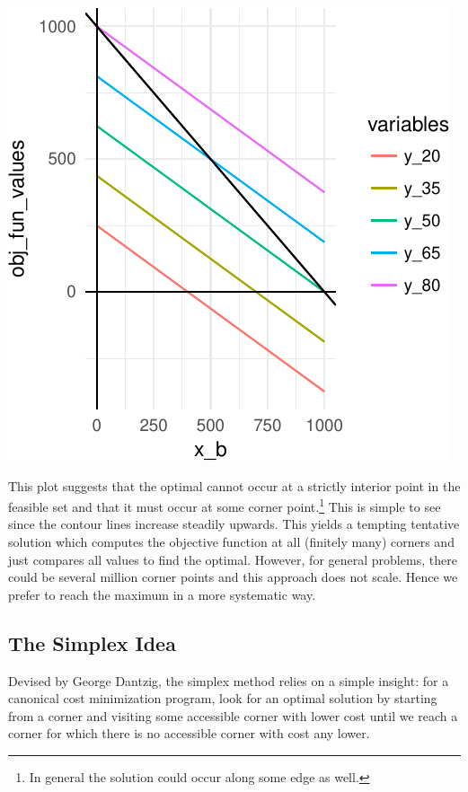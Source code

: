 \documentclass[11pt,]{article}
\let\rmarkdownfootnote\footnote%
\def\footnote{\protect\rmarkdownfootnote}
\begin{document}
\begin{center}\includegraphics{Linear_Programming_files/figure-latex/plot_contour-1} \end{center}

This plot suggests that the optimal cannot occur at a strictly interior
point in the feasible set and that it must occur at some corner
point.\footnote{In general the solution could occur along some edge as
  well.} This is simple to see since the contour lines increase steadily
upwards. This yields a tempting tentative solution which computes the
objective function at all (finitely many) corners and just compares all
values to find the optimal. However, for general problems, there could
be several million corner points and this approach does not scale. Hence
we prefer to reach the maximum in a more systematic way.

\subsection{The Simplex Idea}\label{the-simplex-idea}

Devised by George Dantzig, the simplex method relies on a simple
insight: for a canonical cost minimization program, look for an optimal
solution by starting from a corner and visiting some accessible corner
with lower cost until we reach a corner for which there is no accessible
corner with cost any lower.
\end{document}

